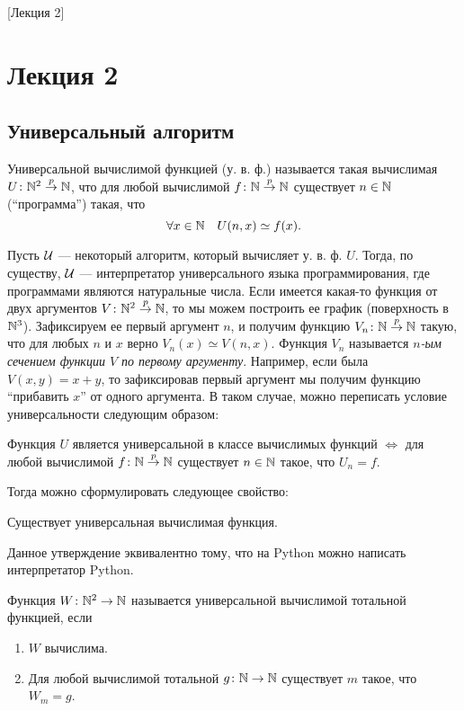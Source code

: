 [Лекция 2]

\section{Лекция 2}

\subsection{Универсальный алгоритм}

\begin{definition}
    Универсальной вычислимой функцией (у. в. ф.) называется такая вычислимая $U \colon \mathbb{N}^{2} \overset{p}{\to} \mathbb{N}$, что для любой вычислимой $f \colon \mathbb{N} \overset{p}{\to} \mathbb{N}$ существует $n \in \mathbb{N}$ (\enquote{программа}) такая, что
    $$
        \forall x \in \mathbb{N} \quad U(n, x) \simeq f(x).
    $$
\end{definition}
Пусть $\mathcal{U}$ --- некоторый алгоритм, который вычисляет у. в. ф. $U$.
Тогда, по существу, $\mathcal{U}$ --- интерпретатор универсального языка программирования, где программами являются натуральные числа.
Если имеется какая-то функция от двух аргументов $V \colon \mathbb{N}^{2} \overset{p}{\to} \mathbb{N}$, то мы можем построить ее график (поверхность в $\mathbb{N}^{3}$).
Зафиксируем ее первый аргумент $n$, и получим функцию $V_{n} \colon \mathbb{N} \overset{p}{\to} \mathbb{N}$ такую, что для любых $n$ и $x$ верно $V_{n}\left(x\right) \simeq V\left(n, x\right)$.
Функция $V_{n}$ называется {\it $n$-ым сечением функции $V$ по первому аргументу}.
Например, если была $V(x, y) = x + y$, то зафиксировав первый аргумент мы получим функцию \enquote{прибавить $x$} от одного аргумента.
В таком случае, можно переписать условие универсальности следующим образом:
\begin{statement}
    Функция $U$ является универсальной в классе вычислимых функций $\iff$ для любой вычислимой $f \colon \mathbb{N} \overset{p}{\to} \mathbb{N}$ существует $n \in \mathbb{N}$ такое, что $U_{n} = f$.
\end{statement}
Тогда можно сформулировать следующее свойство:
\begin{property}[алгоритмов]
    Существует универсальная вычислимая функция.
\end{property}
Данное утверждение эквивалентно тому, что на Python можно написать интерпретатор Python.
\begin{definition}
    Функция $W \colon \mathbb{N}^{2} \to \mathbb{N}$ называется универсальной вычислимой тотальной функцией, если
    \begin{enumerate}
        \item $W$ вычислима.
        \item Для любой вычислимой тотальной $g \colon \mathbb{N} \to \mathbb{N}$ существует $m$ такое, что $W_{m} = g$.
    \end{enumerate}
\end{definition}
